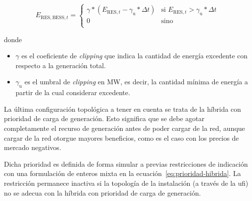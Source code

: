 \begin{samepage}

  \begin{equation}%
    \label{eq:clipping}
    E_{\text{RES}, \text{BESS}, t} =
    \begin{cases}
      \gamma * (E_{\text{RES}, t} - \gamma_{\text{u}} * \Delta t) & \text{si } E_{\text{RES}, t} > \gamma_{\text{u}} * \Delta t \\
      0                                                           & \text{sino}                                                 \\
    \end{cases}
  \end{equation}

  donde

  \begin{itemize}

    \item \( \gamma \) es el coeficiente de \textit{clipping} que indica la cantidad de energía excedente con respecto a la generación total.

    \item \( \gamma_{\text{u}} \) es el umbral de \textit{clipping} en \si{\mega\watt}, es decir, la cantidad mínima de energía a partir de la cual considerar excedente.

  \end{itemize}

\end{samepage}

La última configuración topológica a tener en cuenta se trata de la híbrida con prioridad de carga de generación. Esto significa que se debe agotar completamente el recurso de generación antes de poder cargar de la red, aunque cargar de la red otorgue mayores beneficios, como es el caso con los precios de mercado negativos.

Dicha prioridad es definida de forma simular a previas restricciones de indicación con una formulación de enteros mixta en la ecuación~\ref{eq:prioridad-hibrida}. La restricción permanece inactiva si la topología de la instalación (a través de la \gls{ufi}) no se adecua con la híbrida con prioridad de carga de generación.

